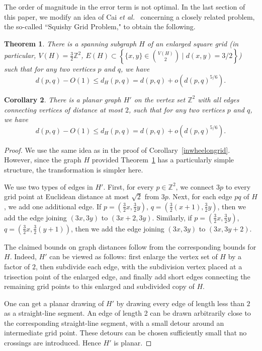 \documentclass[12pt]{article}
\theoremstyle{plain}
\newtheorem{theorem}{Theorem}
\newtheorem{corollary}[theorem]{Corollary}
\theoremstyle{definition}
\theoremstyle{remark}
\newcommand{\ZZ}{{\mathbb Z}}
\def\marrow{{\boldmath {\marginpar[\hfill$\rightarrow \rightarrow$]{$\leftarrow \leftarrow$}}}}
\newcommand{\janos}[1]{{\textcolor{red}{\textit{J\'anos:} \marrow #1}}}
\newcommand{\gabor}[1]{{\textcolor{blue}{\textit{G\'abor:} \marrow #1}}}
\begin{document}


The order of magnitude in the error term is not optimal. In the last section of this paper, we modify an idea of Cai \emph{et al.}~\cite{CaC26} concerning a closely related problem, the so-called ``Squishy Grid Problem," to obtain the following.

\begin{theorem}\label{best}
There is a spanning subgraph $H$ of an enlarged square grid (in particular, $V(H)=\frac32{\ZZ}^2$, $E(H)\subset\left\{\{x,y\}\in\binom{V(H)}2\mid d(x,y)=3/2\right\}$) such that for any two vertices $p$ and $q$, we have
$$d(p,q)-O(1)\le d_H(p,q)=d(p,q)+o(d(p,q)^{5/6}).$$
\end{theorem}

\begin{corollary}
There is a planar graph $H'$ on the vertex set $\ZZ^2$ with all edges connecting vertices of distance at most $2$, such that for any two vertices $p$ and $q$, we have
$$d(p,q)-O(1)\le d_H(p,q)=d(p,q)+o(d(p,q)^{5/6}).$$
\end{corollary}

\begin{proof}
We use the same idea as in the proof of Corollary~\ref{inwheelongrid}. However, since  the graph $H$ provided Theorem~\ref{best} has a particularly simple structure, the transformation is simpler here. 

We use two types of edges in $H'$. First, for every $p\in\ZZ^2$, we connect $3p$ to every grid point at Euclidean distance at most $\sqrt2$ from $3p$. Next, for each edge $pq$ of $H$, we add one additional edge. If $p=(\frac32x,\frac32y)$, $q=(\frac32(x+1),\frac32y)$, then we add the edge joining $(3x,3y)$ to $(3x+2,3y)$. Similarly, if $p=(\frac32x,\frac32y)$, $q=(\frac32x,\frac32(y+1))$, then we add the edge joining $(3x,3y)$ to $(3x,3y+2)$.

The claimed bounds on graph distances follow from the corresponding bounds for $H$. Indeed, $H'$ can be viewed as follows: first enlarge the vertex set of $H$ by a factor of $2$, then subdivide each edge, with the subdivision vertex placed at a trisection point of the enlarged edge, and finally add short edges connecting the remaining grid points to this enlarged and subdivided copy of $H$. 

One can get a planar drawing of $H'$ by drawing every edge of length less than $2$ as a straight-line segment. An edge of length 2 can be drawn arbitrarily close to the corresponding straight-line segment, with a small detour around an intermediate grid point. These detours can be chosen sufficiently small that no crossings are introduced. Hence $H'$ is planar.
\end{proof}
\smallskip
\end{document}

